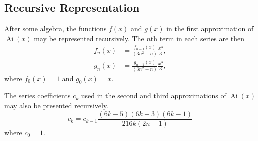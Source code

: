 \documentclass[]{article}
\newcommand{\Ai}[1]{\ensuremath{\operatorname{Ai}({#1})}}
\begin{document}
\subsection{Recursive Representation}\label{app:recursion}

After some algebra, the functions $f(x)$ and $g(x)$ in the first approximation of $\Ai{x}$ may be represented recursively. The $n$th term in each series are then
\begin{align*}
f_{n}(x) &= \frac{f_{n-1}(x)}{(3n^{2} - n)} \frac{x^{3}}{3},\\ 
g_{n}(x) &= \frac{g_{n-1}(x)}{(3n^{2} + n)} \frac{x^{3}}{3},
\end{align*}
where $f_{0}(x) = 1$ and $g_{0}(x) = x$.

The series coefficients $c_{k}$ used in the second and third approximations of $\Ai{x}$ may also be presented recursively.
\[
c_{k} = c_{k-1} \frac{(6k-5)(6k-3)(6k-1)}{216k(2n-1)}
\]
where $c_{0} = 1$.



\end{document}
